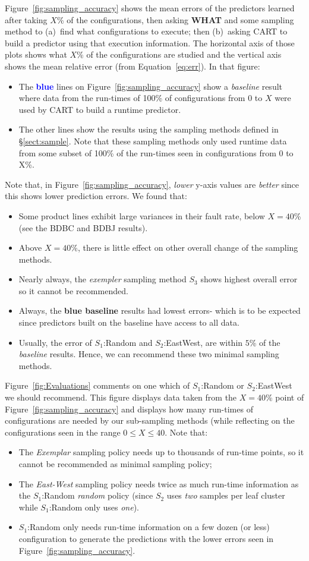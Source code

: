 \documentclass{sig-alternative}
\newcommand{\bi}{\begin{itemize}}%
\newcommand{\ei}{\end{itemize}}
\newcommand{\tion}[1]{\S\ref{sect:#1}}
\newcommand{\fig}[1]{Figure~\ref{fig:#1}}
\newcommand{\eq}[1]{Equation~\ref{eq:#1}}
\newcommand{\what}{{\bf WHAT }}
\begin{document}
\fig{sampling_accuracy} shows the mean errors of the predictors learned
after taking $X$\% of the configurations, then asking  \what and some sampling method
to (a)~find what configurations to execute; then (b)~asking CART to build a predictor
using that execution information. The horizontal axis of those plots shows what $X$\%
of the configurations are studied and the vertical axis shows the mean relative error (from \eq{err}).
In that figure:
\bi
\item
The \textcolor{blue}{{\bf blue}} lines on \fig{sampling_accuracy} show a {\em baseline} result
where data from the run-times of 100\% of  configurations from 0 to $X$ were used by CART
to build a runtime predictor.
\item
The other lines show the results using the sampling methods defined in \tion{sample}.
Note that these sampling methods only used  runtime data from
some subset of 100\% of the run-times seen in configurations
from 0 to X\%.
\ei


Note that, in  \fig{sampling_accuracy}, {\em lower} y-axis values are {\em better} since this shows lower
prediction errors. We found that:
\begin{itemize}

\item Some product lines exhibit large variances in their fault rate, below $X=40$\% (see the BDBC and BDBJ
results).
\item Above $X=40$\%, there is little effect on other overall change of the sampling methods.
\item
Nearly always, the {\em exempler} sampling method $S_3$ shows  highest overall error 
so it cannot be recommended.
\item Always, the  {\bf blue baseline} results  had lowest errors- which is to be
expected since predictors built on the baseline have access to all data.
\item
Usually, the error of  $S_1$:Random and $S_2$:EastWest, are within $5$\% of the {\em baseline} results.
Hence, we can recommend these two minimal sampling methods.
\end{itemize}
\fig{Evaluations} comments on one which  of    $S_1$:Random or $S_2$:EastWest we should recommend.
This figure displays data taken from the $X=40$\% point of \fig{sampling_accuracy} and displays
how many run-times of configurations are needed by our sub-sampling methods (while
reflecting on the configurations seen in the range $0\le X \le 40$. Note that:
\bi
\item
The {\em Exemplar} sampling policy needs up to thousands of run-time points, 
so it cannot be recommended as
minimal sampling
policy;
\item The {\em East-West} sampling policy needs twice as much run-time information as 
the $S_1$:Random {\em random} policy (since $S_2$ uses {\em two} samples per leaf cluster  while
$S_1$:Random only uses {\em one}).
\item $S_1$:Random only needs run-time information on a few dozen (or less) configuration to generate
the predictions with the lower errors seen in \fig{sampling_accuracy}.
\ei
\end{document}

